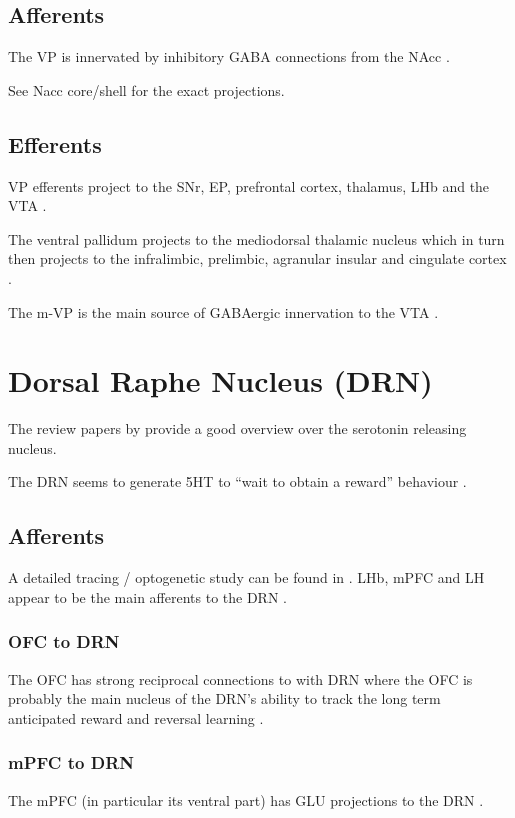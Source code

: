\documentclass[12pt,a4paper]{article}
\begin{document}
\subsection{Afferents}
The VP is innervated by inhibitory GABA connections from the
NAcc \citep{Basar2010}. 

See Nacc core/shell for the exact projections.

\subsection{Efferents}
VP efferents project to the SNr, EP, prefrontal cortex, thalamus, LHb
and the VTA \citep{Groenewegen1993, Ikemoto2007}.

The ventral pallidum projects to the mediodorsal thalamic nucleus
which in turn then projects to the infralimbic, prelimbic, agranular
insular and cingulate cortex \citep{Ikemoto2007}.

The m-VP is the main source of GABAergic innervation to the VTA
\citep{Sesack2010}.








\section{Dorsal Raphe Nucleus (DRN)}
The review papers by \citet{Michelsen2007, Nakamura2013} provide a good overview
over the serotonin releasing nucleus.

The DRN seems to generate 5HT to ``wait to obtain a reward'' behaviour
\citep{Nakamura2013}.

\subsection{Afferents}
A detailed tracing / optogenetic study can be found in
\citet{PollakDorocic2014}. LHb, mPFC and LH appear to be the main
afferents to the DRN \citep{Vertes2010, Sparta2014}
\citep{Lee2003}.

\subsubsection{OFC to DRN}
The OFC has strong reciprocal connections to with DRN \citep{Zhou2015}
where the OFC is probably the main nucleus of the DRN's ability to
track the long term anticipated reward and reversal learning
\citep{Roberts2011}.

\subsubsection{mPFC to DRN}
The mPFC (in particular its ventral part) has GLU projections to the
DRN \citep{Goncalves2009, Lee2003}.
\end{document}
